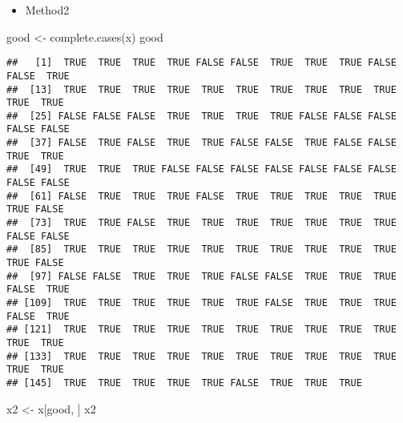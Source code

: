 \documentclass[
]{article}
\newenvironment{Shaded}{\begin{snugshade}}{\end{snugshade}}
\newcommand{\FunctionTok}[1]{\textcolor[rgb]{0.00,0.00,0.00}{#1}}
\newcommand{\NormalTok}[1]{#1}
\newcommand{\OtherTok}[1]{\textcolor[rgb]{0.56,0.35,0.01}{#1}}
\providecommand{\tightlist}{%
  \setlength{\itemsep}{0pt}\setlength{\parskip}{0pt}}
\begin{document}
\begin{itemize}
\tightlist
\item
  Method2
\end{itemize}

\begin{Shaded}
\begin{Highlighting}[]
\NormalTok{good }\OtherTok{\textless{}{-}} \FunctionTok{complete.cases}\NormalTok{(x)}
\NormalTok{good}
\end{Highlighting}
\end{Shaded}

\begin{verbatim}
##   [1]  TRUE  TRUE  TRUE  TRUE FALSE FALSE  TRUE  TRUE  TRUE FALSE FALSE  TRUE
##  [13]  TRUE  TRUE  TRUE  TRUE  TRUE  TRUE  TRUE  TRUE  TRUE  TRUE  TRUE  TRUE
##  [25] FALSE FALSE FALSE  TRUE  TRUE  TRUE  TRUE FALSE FALSE FALSE FALSE FALSE
##  [37] FALSE  TRUE FALSE  TRUE  TRUE FALSE FALSE  TRUE FALSE FALSE  TRUE  TRUE
##  [49]  TRUE  TRUE  TRUE FALSE FALSE FALSE FALSE FALSE FALSE FALSE FALSE FALSE
##  [61] FALSE  TRUE  TRUE  TRUE FALSE  TRUE  TRUE  TRUE  TRUE  TRUE  TRUE FALSE
##  [73]  TRUE  TRUE FALSE  TRUE  TRUE  TRUE  TRUE  TRUE  TRUE  TRUE FALSE FALSE
##  [85]  TRUE  TRUE  TRUE  TRUE  TRUE  TRUE  TRUE  TRUE  TRUE  TRUE  TRUE FALSE
##  [97] FALSE FALSE  TRUE  TRUE  TRUE FALSE FALSE  TRUE  TRUE  TRUE FALSE  TRUE
## [109]  TRUE  TRUE  TRUE  TRUE  TRUE  TRUE FALSE  TRUE  TRUE  TRUE FALSE  TRUE
## [121]  TRUE  TRUE  TRUE  TRUE  TRUE  TRUE  TRUE  TRUE  TRUE  TRUE  TRUE  TRUE
## [133]  TRUE  TRUE  TRUE  TRUE  TRUE  TRUE  TRUE  TRUE  TRUE  TRUE  TRUE  TRUE
## [145]  TRUE  TRUE  TRUE  TRUE  TRUE FALSE  TRUE  TRUE  TRUE
\end{verbatim}

\begin{Shaded}
\begin{Highlighting}[]
\NormalTok{x2 }\OtherTok{\textless{}{-}}\NormalTok{ x[good, ]}
\NormalTok{x2}
\end{Highlighting}
\end{Shaded}
\end{document}

